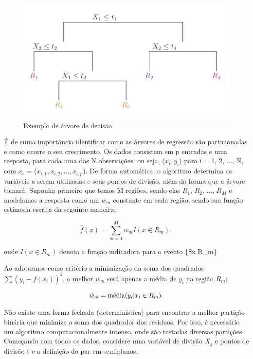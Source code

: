 \documentclass[
	12pt,				%
	a4paper,		%
	oneside,    %
	chapter=TITLE,		   %
	section=TITLE,		   %
	subsection=TITLE,	   %
	subsubsection=TITLE, %
	english,			%
	french,				%
	spanish,			%
	brazil,				%
]{abntex2}
\begin{document}
\begin{figure}
\centering
\includegraphics[width=\textwidth,height=0.3\textheight]{../fig/arvore_decisao.png}
\caption{Exemplo de árvore de decisão\label{fig:tree}}
\end{figure}

É de suma importância identificar como as árvores de regressão são
particionadas e como ocorre o seu crescimento. Os dados consistem em p
entradas e uma resposta, para cada uma das N observações: ou seja,
(\(x_i,y_i\)) para i = 1, 2, \(\dots\), N, com \(x_i\) =
(\(x_{i,1}, x_{i,2}, \dots, x_{i,p}\)). De forma automática, o algoritmo
determina as variáveis a serem utilizadas e seus pontos de divisão, além
da forma que a árvore tomará. Suponha primeiro que temos M regiões,
sendo elas \(R_1\), \(R_2\), \(\dots\), \(R_M\) e modelamos a resposta
como um \(w_m\) constante em cada região, sendo sua função estimada
escrita da seguinte maneira:

\[
\hat{f}(x) = \sum^M_{m=1}w_m I(x \in R_m),
\]

\noindent onde \(I(x \in R_m)\) denota a função indicadora para o evento
\{\$x \in R\_m\}

Ao adotarmos como critério a minimização da soma dos quadrados
\(\sum (y_i - f(x_i))^2\), o melhor \(w_m\) será apenas a média de
\(y_i\) na região \(R_m\):

\[\hat{w}_m= \hbox{média} (y_i|x_i \in R_m).\]

Não existe uma forma fechada (determinística) para encontrar a melhor
partição binária que minimize a soma dos quadrados dos resíduos. Por
isso, é necessário um algoritmo computacionalmente intenso, onde são
testadas diversas partições. Começando com todos os dados, considere uma
variável de divisão \(X_j\) e pontos de divisão t e a definição do par
em semiplanos.
\end{document}
